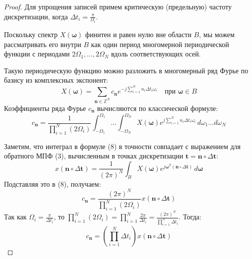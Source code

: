 \documentclass[12pt,a4paper]{article}
\newcommand{\vect}[1]{\mathbf{#1}}
\begin{document}
\begin{proof}
Для упрощения записей примем критическую (предельную) частоту дискретизации, когда $\Delta t_i = \frac{\pi}{\Omega_i}$.

Поскольку спектр $X(\vect{\omega})$ финитен и равен нулю вне области $B$, мы можем рассматривать его внутри $B$ как один период многомерной периодической функции с периодами $2\Omega_1, \dots, 2\Omega_N$ вдоль соответствующих осей.

Такую периодическую функцию можно разложить в многомерный ряд Фурье по базису из комплексных экспонент:
\begin{equation}
X(\vect{\omega}) = \sum_{\vect{n} \in \mathbb{Z}^N} c_{\vect{n}} e^{-j \sum_{i=1}^N n_i \Delta t_i \omega_i} \quad \text{при } \vect{\omega} \in B
\end{equation}
Коэффициенты ряда Фурье $c_{\vect{n}}$ вычисляются по классической формуле:
\begin{equation}
c_{\vect{n}} = \frac{1}{\prod_{i=1}^N (2\Omega_i)} \int_{-\Omega_1}^{\Omega_1} \dots \int_{-\Omega_N}^{\Omega_N} X(\vect{\omega}) e^{j \sum_{i=1}^N n_i \Delta t_i \omega_i} \, d\omega_1 \dots d\omega_N
\end{equation}

Заметим, что интеграл в формуле (8) в точности совпадает с выражением для обратного МПФ (3), вычисленным в точках дискретизации $\vect{t} = \vect{n} \circ \Delta \vect{t}$:
$$ x(\vect{n} \circ \Delta \vect{t}) = \frac{1}{(2\pi)^N} \int_{B} X(\vect{\omega}) e^{j \vect{\omega}^T (\vect{n} \circ \Delta \vect{t})} \, d\vect{\omega} $$
Подставляя это в (8), получаем:
\begin{equation}
c_{\vect{n}} = \frac{(2\pi)^N}{\prod_{i=1}^N (2\Omega_i)} x(\vect{n} \circ \Delta \vect{t})
\end{equation}
Так как $\Omega_i = \frac{\pi}{\Delta t_i}$, то $\prod_{i=1}^N (2\Omega_i) = \prod_{i=1}^N \frac{2\pi}{\Delta t_i} = \frac{(2\pi)^N}{\prod_{i=1}^N \Delta t_i}$.
Тогда:
$$ c_{\vect{n}} = \left( \prod_{i=1}^N \Delta t_i \right) x(\vect{n} \circ \Delta \vect{t}) $$


\end{proof}
\end{document}
